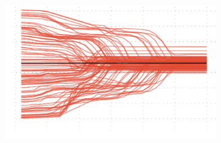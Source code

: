 \begin{figure}[htbp]
{\begin{subfigure}[t]{0.5\textwidth+0.4in}
    \end{subfigure}%
    \begin{subfigure}[t]{0.5\textwidth+0.4in}%
		\includegraphics{img/ballistic_bf_ux}%
    \end{subfigure}}\\%
\end{figure}
